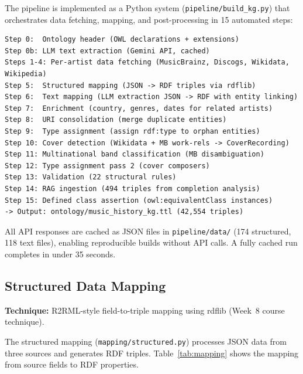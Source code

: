 \documentclass[11pt,a4paper]{article}
\begin{document}
The pipeline is implemented as a Python system (\texttt{pipeline/build\_kg.py}) that orchestrates data fetching, mapping, and post-processing in 15 automated steps:

\begin{lstlisting}
Step 0:  Ontology header (OWL declarations + extensions)
Step 0b: LLM text extraction (Gemini API, cached)
Steps 1-4: Per-artist data fetching (MusicBrainz, Discogs, Wikidata, Wikipedia)
Step 5:  Structured mapping (JSON -> RDF triples via rdflib)
Step 6:  Text mapping (LLM extraction JSON -> RDF with entity linking)
Step 7:  Enrichment (country, genres, dates for related artists)
Step 8:  URI consolidation (merge duplicate entities)
Step 9:  Type assignment (assign rdf:type to orphan entities)
Step 10: Cover detection (Wikidata + MB work-rels -> CoverRecording)
Step 11: Multinational band classification (MB disambiguation)
Step 12: Type assignment pass 2 (cover composers)
Step 13: Validation (22 structural rules)
Step 14: RAG ingestion (494 triples from completion analysis)
Step 15: Defined class assertion (owl:equivalentClass instances)
-> Output: ontology/music_history_kg.ttl (42,554 triples)
\end{lstlisting}

All API responses are cached as JSON files in \texttt{pipeline/data/} (174 structured, 118 text files), enabling reproducible builds without API calls. A fully cached run completes in under 35 seconds.

\subsection{Structured Data Mapping}

\textbf{Technique:} R2RML-style field-to-triple mapping using rdflib (Week~8 course technique).

The structured mapping (\texttt{mapping/structured.py}) processes JSON data from three sources and generates RDF triples. Table~\ref{tab:mapping} shows the mapping from source fields to RDF properties.
\end{document}
